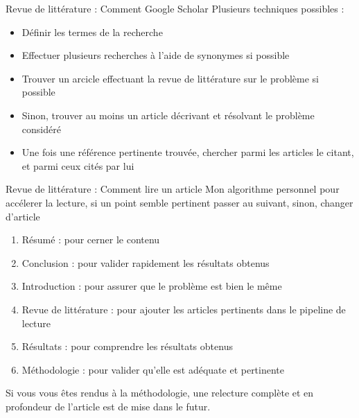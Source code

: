\documentclass[french]{beamer}
\begin{document}
\begin{frame}{Revue de littérature : Comment Google Scholar}
Plusieurs techniques possibles : 
\begin{itemize}
	\item Définir les termes de la recherche
	\item Effectuer plusieurs recherches à l'aide de synonymes si possible
	\item Trouver un arcicle effectuant la revue de littérature sur le problème si possible
	\item Sinon, trouver au moins un article décrivant et résolvant le problème considéré
	\item Une fois une référence pertinente trouvée, chercher parmi les articles le citant, et parmi ceux cités par lui
\end{itemize}
\end{frame}

\begin{frame}{Revue de littérature : Comment lire un article}
Mon algorithme personnel  pour accélerer la lecture, si un point semble pertinent passer au suivant, sinon, changer d'article
\begin{enumerate}
	\item Résumé : pour cerner le contenu
	\item Conclusion : pour valider rapidement les résultats obtenus
	\item Introduction : pour assurer que le problème est bien le même
	\item Revue de littérature : pour ajouter les articles pertinents dans le pipeline de lecture
	\item Résultats : pour comprendre les résultats obtenus
	\item Méthodologie : pour valider qu'elle est adéquate et pertinente
\end{enumerate}
Si vous vous êtes rendus à la méthodologie, une relecture complète et en profondeur de l'article est de mise dans le futur.
\end{frame}
\end{document}
